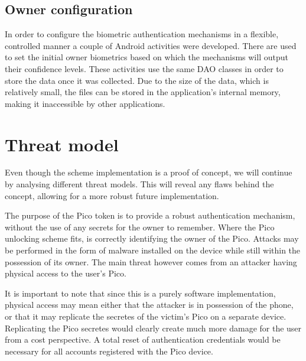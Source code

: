 \subsection{Owner configuration}
In order to configure the biometric authentication mechanisms in a flexible, controlled manner a couple of Android activities were developed. There are used to set the initial owner biometrics based on which the mechanisms will output their confidence levels. These activities use the same DAO classes in order to store the data once it was collected. Due to the size of the data, which is relatively small, the files can be stored in the application's internal memory, making it inaccessible by other applications.

\section{Threat model}

Even though the scheme implementation is a proof of concept, we will continue by analysing different threat models. This will reveal any flaws behind the concept, allowing for a more robust future implementation.

The purpose of the Pico token is to provide a robust authentication mechanism, without the use of any secrets for the owner to remember. Where the Pico unlocking scheme fits, is correctly identifying the owner of the Pico. Attacks may be performed in the form of malware installed on the device while still within the possession of its owner. The main threat however comes from an attacker having physical access to the user's Pico. 

It is important to note that since this is a purely software implementation, physical access may mean either that the attacker is in possession of the phone, or that it may replicate the secretes of the victim's Pico on a separate device. Replicating the Pico secretes would clearly create much more damage for the user from a cost perspective. A total reset of authentication credentials would be necessary for all accounts registered with the Pico device.



